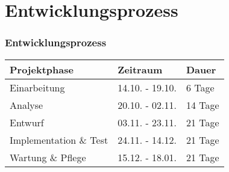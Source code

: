 \documentclass[]{tudbeamer}
\begin{document}
\section{Entwicklungsprozess}
\begin{frame}
\frametitle{Entwicklungsprozess}
\begin{tabular}{p{}|p{}|p{}}
Projektphase & Zeitraum & Dauer\\ \hline
Einarbeitung & 14.10. - 19.10. & 6 Tage\\
Analyse & 20.10. - 02.11. & 14 Tage\\
Entwurf & 03.11. - 23.11. & 21 Tage\\
Implementation \& Test & 24.11. - 14.12. & 21 Tage\\
Wartung \& Pflege & 15.12. - 18.01. & 21 Tage\\
\end{tabular}
\end{frame}
\end{document}
